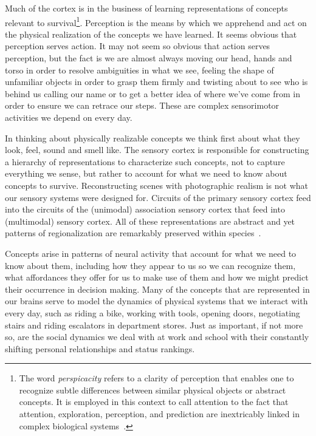 

Much of the cortex is in the business of learning representations of concepts relevant to survival\footnote{%
%
  The word {\it{perspicacity}} refers to a clarity of perception that enables one to recognize subtle differences between similar physical objects or abstract concepts. It is employed in this context to call attention to the fact that attention, exploration, perception, and prediction are inextricably linked in complex biological systems~\cite{RaoandBallardNATURE-NEUROSCIENCE-99,BarlowNC-89,BaddeleyQJoEP-86,ClarkBBS-13}.}.
%
Perception is the means by which we apprehend and act on the physical realization of the concepts we have learned. It seems obvious that perception serves action. It may not seem so obvious that action serves perception, but the fact is we are almost always moving our head, hands and torso in order to resolve ambiguities in what we see, feeling the shape of unfamiliar objects in order to grasp them firmly and twisting about to see who is behind us calling our name or to get a better idea of where we've come from in order to ensure we can retrace our steps. These are complex sensorimotor activities we depend on every day.

In thinking about physically realizable concepts we think first about what they look, feel, sound and smell like. The sensory cortex is responsible for constructing a hierarchy of representations to characterize such concepts, not to capture everything we sense, but rather to account for what we need to know about concepts to survive. Reconstructing scenes with photographic realism is not what our sensory systems were designed for. Circuits of the primary sensory cortex feed into the circuits of the (unimodal) association sensory cortex that feed into (multimodal) sensory cortex. All of these representations are abstract and yet patterns of regionalization are remarkably preserved within species~\cite{ChenetalNEURON-18,PortuguesetalNEURON-14,KolsteretalJoN-09}.

Concepts arise in patterns of neural activity that account for what we need to know about them, including how they appear to us so we can recognize them, what affordances they offer for us to make use of them and how we might predict their occurrence in decision making. Many of the concepts that are represented in our brains serve to model the dynamics of physical systems that we interact with every day, such as riding a bike, working with tools, opening doors, negotiating stairs and riding escalators in department stores. Just as important, if not more so, are the social dynamics we deal with at work and school with their constantly shifting personal relationships and status rankings. 

